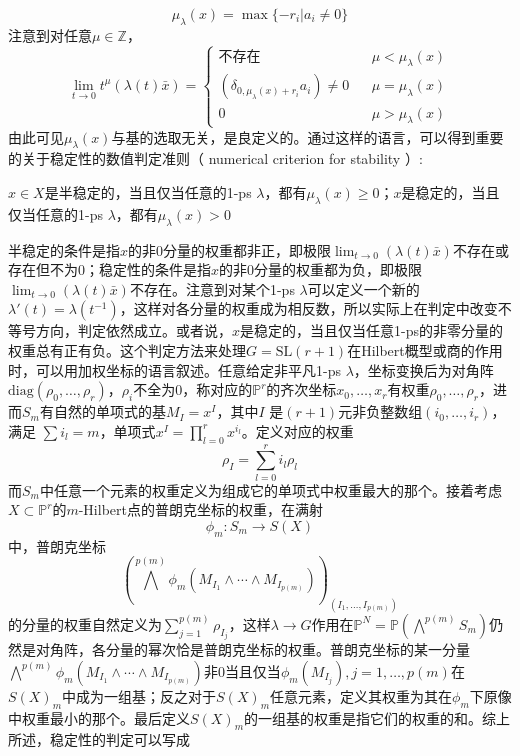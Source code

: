 $$ \mu_\lambda(x)=\max\{-r_i|a_i\neq 0\} $$
注意到对任意$ \mu \in \mathbb{Z} $，
\begin{equation*}
\lim _{t\to 0}t^\mu (\lambda(t)\bar{x})=\left\{
\begin{array}{rcl}
\text{不存在} & & {\mu <\mu_\lambda(x)}\\
(\delta_{0,\mu_\lambda(x)+r_i}a_i)\neq 0 & & {\mu =\mu_\lambda(x)}\\
0 & & {\mu >\mu_\lambda(x)}
\end{array} \right.
\end{equation*}
由此可见$ \mu_\lambda(x) $与基的选取无关，是良定义的。通过这样的语言，可以得到重要的关于稳定性的数值判定准则（ numerical criterion for stability ）:
\begin{theorem}
	$ x\in X $是半稳定的，当且仅当任意的1-ps $ \lambda $，都有$ \mu_\lambda(x)\geqslant0 $；$ x $是稳定的，当且仅当任意的1-ps $ \lambda $，都有$ \mu_\lambda(x)>0 $
\end{theorem}
半稳定的条件是指$ x $的非$ 0 $分量的权重都非正，即极限$ \lim _{t\to 0} (\lambda(t)\bar{x}) $不存在或存在但不为$ 0 $；稳定性的条件是指$ x $的非$ 0 $分量的权重都为负，即极限$ \lim _{t\to 0} (\lambda(t)\bar{x}) $不存在。注意到对某个1-ps $ \lambda $可以定义一个新的$ \lambda'(t)=\lambda(t^{-1}) $，这样对各分量的权重成为相反数，所以实际上在判定中改变不等号方向，判定依然成立。或者说，$ x $是稳定的，当且仅当任意1-ps的非零分量的权重总有正有负。这个判定方法来处理$ G=\mathrm{SL}(r+1) $在Hilbert概型或商的作用时，可以用加权坐标的语言叙述。任意给定非平凡1-ps $ \lambda $，坐标变换后为对角阵$ \mathrm{diag}(\rho_0,\ldots,\rho_r) $，$ \rho_i $不全为$ 0 $，称对应的$ \mathbb{P}^r $的齐次坐标$ x_0,\ldots,x_r $有权重$ \rho_0,\ldots,\rho_r $，进而$ S_m $有自然的单项式的基$ M_I=x^I $，其中$ I$ 是$ (r+1) $元非负整数组$ (i_0,\ldots,i_r) $，满足 $ \sum i_l=m $，单项式$ x^I=\prod_{l=0}^{r}x^{i_l} $。定义对应的权重
$$ \rho_I=\sum_{l=0}^{r}i_l\rho_l $$
而$ S_m $中任意一个元素的权重定义为组成它的单项式中权重最大的那个。接着考虑$ X\subset \mathbb{P}^r $的$ m $-Hilbert点的普朗克坐标的权重，在满射
$$ \phi_m:S_m\to S(X) $$
中，普朗克坐标
$$ (\bigwedge ^{p(m)}\phi_m(M_{I_1}\wedge\cdots \wedge M_{I_{p(m)}}))_{(I_1,\ldots,I_{p(m)})} $$
的分量的权重自然定义为$ \sum_{j=1}^{p(m)}\rho_{I_j} $，这样$ \lambda \to G$作用在$ \mathbb{P}^N=\mathbb{P}(\bigwedge^{p(m)} S_m) $仍然是对角阵，各分量的幂次恰是普朗克坐标的权重。普朗克坐标的某一分量$ \bigwedge ^{p(m)}\phi_m(M_{I_1}\wedge\cdots \wedge M_{I_{p(m)}}) $非$ 0 $当且仅当$ \phi_m(M_{I_j}),j=1,\ldots,p(m) $在$ S(X)_m $中成为一组基；反之对于$ S(X)_m $任意元素，定义其权重为其在$ \phi_m $下原像中权重最小的那个。最后定义$ S(X)_m $的一组基的权重是指它们的权重的和。综上所述，稳定性的判定可以写成

